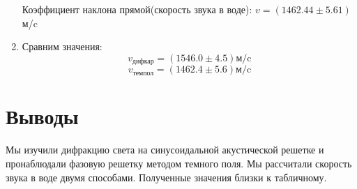 \documentclass[a4paper,12pt]{article}
\begin{document}
\begin{enumerate}
    Коэффициент наклона прямой(скорость звука в воде): $v=(1462.44\pm5.61)$м/c

    \item Сравним значения:
    $$
    v_\text{дифкар} = (1546.0\pm4.5) \text{м/c}
    $$
    $$
    v_\text{темпол} = (1462.4\pm5.6)\text{м/c}
    $$
\end{enumerate}

\section{Выводы}
Мы изучили дифракцию света на синусоидальной акустической решетке и пронаблюдали фазовую решетку методом темного поля. Мы рассчитали скорость звука в воде двумя способами. Полученные значения близки к табличному.
\end{document}
